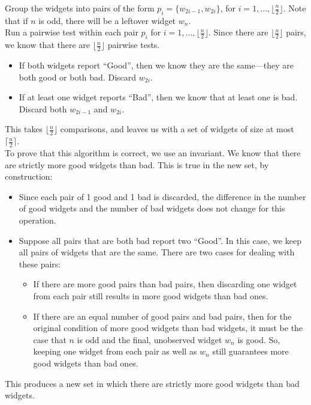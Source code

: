 \documentclass[12pt]{article}
\begin{document}
\begin{enumerate}
\begin{enumerate}
    Group the widgets into pairs of the form $p_i=\{w_{2i-1},w_{2i}\}$, for $i=1,...,\lfloor\frac{n}{2}\rfloor$. Note that if $n$ is odd, there will be a leftover widget $w_n$.\\
    
    Run a pairwise test within each pair $p_i$ for $i=1,...,\lfloor\frac{n}{2}\rfloor$. Since there are $\lfloor\frac{n}{2}\rfloor$ pairs, we know that there are $\lfloor\frac{n}{2}\rfloor$ pairwise tests. 
    \begin{itemize}
    \item If both widgets report ``Good'', then we know they are the same---they are both good or both bad. Discard $w_{2i}$.
   	\item If at least one widget reports ``Bad'', then we know that at least one is bad. Discard both $w_{2i-1}$ and $w_{2i}$.
    \end{itemize}
    
    This takes $\lfloor\frac{n}{2}\rfloor$ comparisons, and leaves us with a set of widgets of size at most $\lceil\frac{n}{2}\rceil$.\\
    
    To prove that this algorithm is correct, we use an invariant. We know that there are strictly more good widgets than bad. This is true in the new set, by construction:
    \begin{itemize}
    \item Since each pair of 1 good and 1 bad is discarded, the difference in the number of good widgets and the number of bad widgets does not change for this operation.
    \item Suppose all pairs that are both bad report two ``Good''. In this case, we keep all pairs of widgets that are the same. There are two cases for dealing with these pairs:
    	\begin{itemize}
    	\item If there are more good pairs than bad pairs, then discarding one widget from each pair still results in more good widgets than bad ones.
        \item If there are an equal number of good pairs and bad pairs, then for the original condition of more good widgets than bad widgets, it must be the case that $n$ is odd and the final, unobserved widget $w_n$ is good. So, 
keeping one widget from each pair as well as $w_n$ still guarantees more good widgets than bad ones.
    	\end{itemize}
    \end{itemize}
    This produces a new set in which there are strictly more good widgets than bad widgets. \\
    

\end{enumerate}
\end{enumerate}
\end{document}
